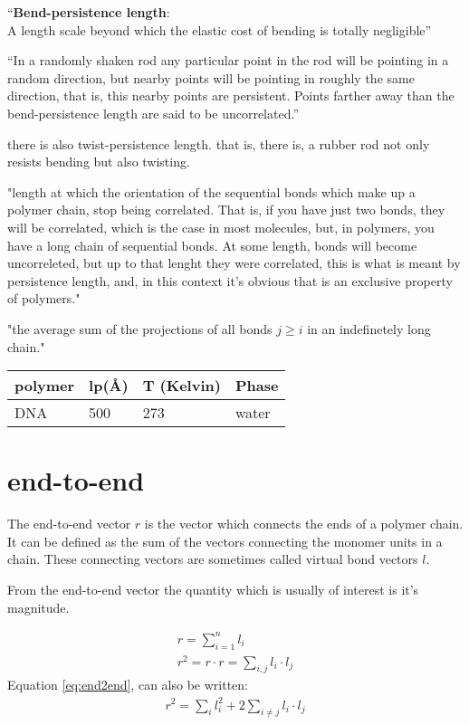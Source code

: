 ``\textbf{Bend-persistence length}:\\ 
A length scale beyond which the elastic cost of bending is totally
negligible''

``In a randomly shaken rod any particular point in the rod will be
pointing in a random direction, but nearby points will be pointing in
roughly the same direction, that is, this nearby points are
persistent. Points farther away than the bend-persistence length are
said to be uncorrelated.''

there is also twist-persistence length.
that is, there is, a rubber rod not only resists bending but also twisting.

"length at which the orientation of the sequential bonds which make
up a polymer chain, stop being correlated. That is, if you have just
two bonds, they will be correlated, which is the case in most
molecules, but, in polymers, you have a long chain of sequential
bonds. At some length, bonds will become uncorreleted, but up to that
lenght they were correlated, this is what is meant by persistence
length, and, in this context it's obvious that is an exclusive
property of polymers."

"the average sum of the projections of all bonds $ j \geq i$  in an 
indefinetely long chain."


\begin{table}[htbp]
\begin{center}
\begin{tabular}{|l|l|l|l|}
\hline 
polymer & lp(\AA) & T (Kelvin) & Phase \\ \hline
DNA     & 500     &  273       & water \\ \hline
\end{tabular}
\end{center}
\end{table}



\section{end-to-end}
The end-to-end vector  $r$ is the vector which connects  the ends of a 
polymer chain.  It  can be defined  as the sum  of the vectors connecting the
monomer units in a chain. These connecting vectors are sometimes called
virtual  bond vectors $l$.  

From  the end-to-end  vector  the quantity
which is usually of interest is it's magnitude.

\begin{gather}
\label{eq:end2end}
r = \sum_{i=1}^{n} l_{i}\\
r^2 = r \cdot r = \sum_{i,j}l_{i} \cdot l_{j}
\end{gather}
Equation \ref{eq:end2end}, can also be written:
\begin{gather}
r^2 = \sum_{i}l_{i}^{2} + 2 \sum_{i\neq j} l_{i} \cdot l_{j}
\end{gather}  

